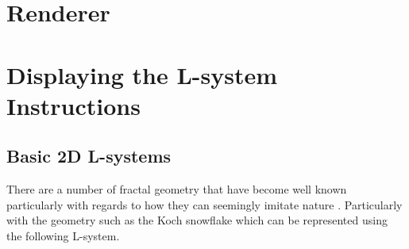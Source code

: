 \section{Renderer}

\begin{flushleft}


\end{flushleft}

\section{Displaying the L-system Instructions} \label{Display L-system Instructions}

\subsection{Basic 2D L-systems} 

There are a number of fractal geometry that have become well known particularly with regards to how they can seemingly imitate nature \cite{mandelbrot1982fractal}. Particularly with the geometry such as the Koch snowflake which can be represented using the following L-system.

